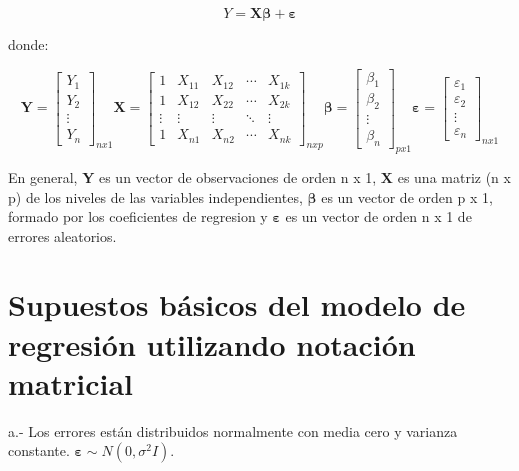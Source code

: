 \documentclass[
]{book}
\begin{document}
\[
\begin{equation}
Y = \boldsymbol{X\beta+\varepsilon}
\end{equation}
\label{eq:mrlmm}
\]

donde:

\[
\begin{equation}
\mathbf{Y} = \begin{bmatrix}
Y_{1}\\ 
Y_{2}\\ 
\vdots \\
Y_{n}
\end{bmatrix}_{nx1}
\mathbf{X} =\begin{bmatrix}
 1&  X_{11}&  X_{12}&  \cdots & X_{1k}\\ 
 1&  X_{12}&  X_{22}&  \cdots& X_{2k}\\ 
 \vdots &  \vdots&  \vdots&  \ddots & \vdots\\ 
 1&  X_{n1}&  X_{n2}&  \cdots&  X_{nk}
\end{bmatrix}_{nxp}
\boldsymbol{\beta } = \begin{bmatrix}
\beta_{1}\\ 
\beta_{2}\\ 
\vdots \\
\beta_{n}
\end{bmatrix}_{px1}
\boldsymbol{\varepsilon } = \begin{bmatrix}
\varepsilon_{1}\\ 
\varepsilon_{2}\\ 
\vdots \\
\varepsilon_{n}
\end{bmatrix}_{nx1}
\end{equation}
\]

En general, \textbf{Y} es un vector de observaciones de orden n x 1, \(\mathbf{X}\) es una matriz (n x p) de los niveles de las variables independientes, \(\boldsymbol{\beta }\) es un vector de orden p x 1, formado por los coeficientes de regresion y \(\boldsymbol{\varepsilon}\) es un vector de orden n x 1 de errores aleatorios.

\hypertarget{supuestos-buxe1sicos-del-modelo-de-regresiuxf3n-utilizando-notaciuxf3n-matricial}{%
\section{Supuestos básicos del modelo de regresión utilizando notación matricial}\label{supuestos-buxe1sicos-del-modelo-de-regresiuxf3n-utilizando-notaciuxf3n-matricial}}

a.- Los errores están distribuidos normalmente con media cero y varianza constante. \(\boldsymbol{\varepsilon}\sim N(0,\sigma^2I)\).
\end{document}
